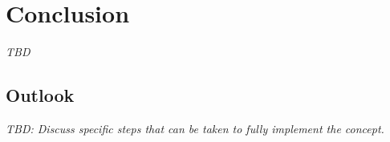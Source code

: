 \chapter{Conclusion}
\label{chap:conclusion}

\emph{TBD}

\section{Outlook}
\label{sec:outlook}
\emph{TBD: Discuss specific steps that can be taken to fully implement the concept.}